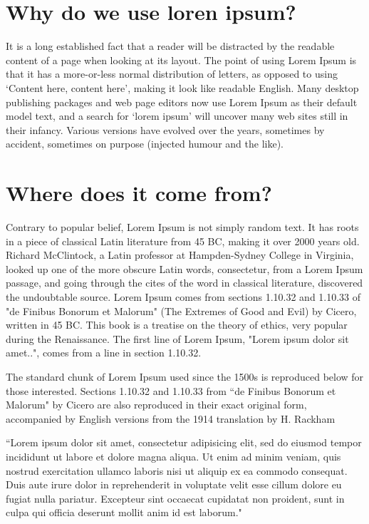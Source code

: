 \section{Why do we use loren ipsum?} %


It is a long established fact that a reader will be distracted by the readable content of a page when looking at its layout. The point of using Lorem Ipsum is that it has a more-or-less normal distribution of letters, as opposed to using `Content here, content here', making it look like readable English. Many desktop publishing packages and web page editors now use Lorem Ipsum as their default model text, and a search for `lorem ipsum' will uncover many web sites still in their infancy. Various versions have evolved over the years, sometimes by accident, sometimes on purpose (injected humour and the like).

\section{Where does it come from?}  %
\label{section1.3}

Contrary to popular belief, Lorem Ipsum is not simply random text. It has roots in a piece of classical Latin literature from 45 BC, making it over 2000 years old. Richard McClintock, a Latin professor at Hampden-Sydney College in Virginia, looked up one of the more obscure Latin words, consectetur, from a Lorem Ipsum passage, and going through the cites of the word in classical literature, discovered the undoubtable source. Lorem Ipsum comes from sections 1.10.32 and 1.10.33 of "de Finibus Bonorum et Malorum" (The Extremes of Good and Evil) by Cicero, written in 45 BC. This book is a treatise on the theory of ethics, very popular during the Renaissance. The first line of Lorem Ipsum, "Lorem ipsum dolor sit amet..", comes from a line in section 1.10.32.

The standard chunk of Lorem Ipsum used since the 1500s is reproduced below for those interested. Sections 1.10.32 and 1.10.33 from ``de Finibus Bonorum et Malorum" by Cicero are also reproduced in their exact original form, accompanied by English versions from the 1914 translation by H. Rackham

``Lorem ipsum dolor sit amet, consectetur adipisicing elit, sed do eiusmod tempor incididunt ut labore et dolore magna aliqua. Ut enim ad minim veniam, quis nostrud exercitation ullamco laboris nisi ut aliquip ex ea commodo consequat. Duis aute irure dolor in reprehenderit in voluptate velit esse cillum dolore eu fugiat nulla pariatur. Excepteur sint occaecat cupidatat non proident, sunt in culpa qui officia deserunt mollit anim id est laborum."

